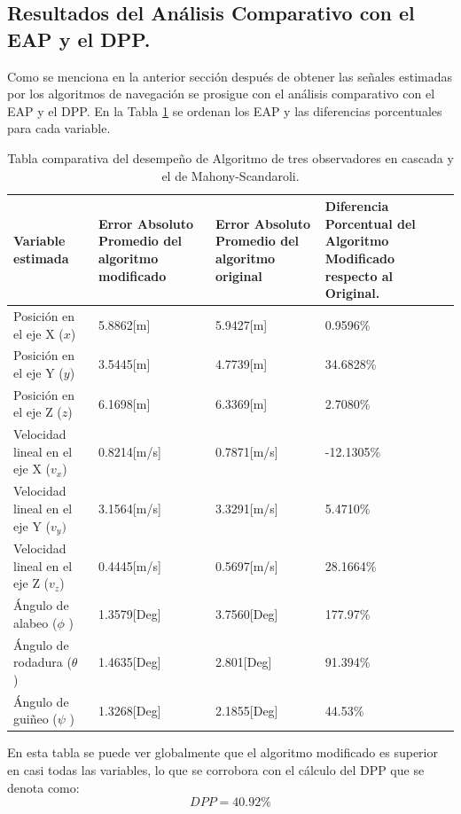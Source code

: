 \documentclass[conference]{IEEEtran}
\begin{document}
\subsection{Resultados del Análisis Comparativo con el EAP y el DPP.}
Como se menciona en la anterior sección después de obtener las señales estimadas por los algoritmos de navegación se prosigue con el análisis comparativo con el EAP y el DPP. En la Tabla \ref{resultados_tb1} se ordenan los EAP y las diferencias porcentuales para cada variable.\par
\begin{table}
\begin{center}
\begin{tabular}{|p{2in}|p{1.0in}|p{1.0in}|p{1.0in}|} \hline
\textbf{Variable estimada}&\small\textbf{Error Absoluto Promedio del algoritmo modificado}&\small\textbf{Error Absoluto Promedio del algoritmo original}&\small\textbf{Diferencia Porcentual del Algoritmo Modificado respecto al Original.} \\ \hline
Posición en el eje X ($x$) &5.8862[m]&5.9427[m]&0.9596\%\\ \hline
Posición en el eje Y ($y$) &3.5445[m]&4.7739[m]&34.6828\%\\ \hline
Posición en el eje Z ($z$)&6.1698[m]&6.3369[m]&2.7080\%\\ \hline
Velocidad lineal en el eje X ($v_x$) &0.8214[m/s]&0.7871[m/s]&{-12.1305\%}\\ \hline
Velocidad lineal en el eje Y ($v_y)$&3.1564[m/s]&3.3291[m/s]&5.4710\%\\ \hline
Velocidad lineal en el eje Z ($v_z$)&0.4445[m/s]&0.5697[m/s]&28.1664\%\\ \hline
Ángulo de alabeo ($\phi$ )&1.3579[Deg]&3.7560[Deg]&177.97\%\\ \hline
Ángulo de rodadura ($\theta$ )&1.4635[Deg]&2.801[Deg]&91.394\%\\ \hline
Ángulo de guiñeo ($\psi$ )&1.3268[Deg]&2.1855[Deg]&44.53\%\\ \hline
\end{tabular}
\caption{Tabla comparativa del desempeño de Algoritmo de tres observadores en cascada y el de Mahony-Scandaroli.}
\label{resultados_tb1}
\end{center}
\end{table}
En esta tabla se puede ver globalmente que el algoritmo modificado es superior en casi todas las variables, lo que se corrobora con el cálculo del DPP que se denota como:
\begin{equation}
DPP=40.92\%
\end{equation}
\end{document}
